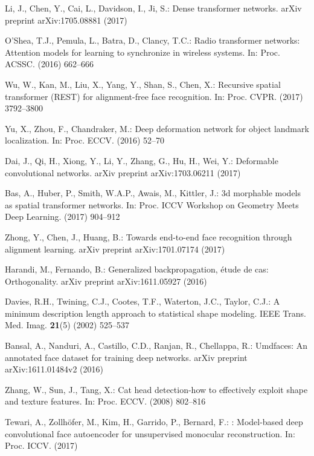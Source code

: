 \documentclass[runningheads]{llncs}
\begin{document}
\begin{thebibliography}{10}
Li, J., Chen, Y., Cai, L., Davidson, I., Ji, S.:
\newblock Dense transformer networks.
\newblock arXiv preprint arXiv:1705.08881 (2017)

O'Shea, T.J., Pemula, L., Batra, D., Clancy, T.C.:
\newblock Radio transformer networks: Attention models for learning to
  synchronize in wireless systems.
\newblock In: Proc. ACSSC. (2016)  662--666

Wu, W., Kan, M., Liu, X., Yang, Y., Shan, S., Chen, X.:
\newblock Recursive spatial transformer ({REST}) for alignment-free face
  recognition.
\newblock In: Proc. CVPR. (2017)  3792--3800

Yu, X., Zhou, F., Chandraker, M.:
\newblock Deep deformation network for object landmark localization.
\newblock In: Proc. ECCV. (2016)  52--70

Dai, J., Qi, H., Xiong, Y., Li, Y., Zhang, G., Hu, H., Wei, Y.:
\newblock Deformable convolutional networks.
\newblock arXiv preprint arXiv:1703.06211 (2017)

Bas, A., Huber, P., Smith, W.A.P., Awais, M., Kittler, J.:
\newblock 3d morphable models as spatial transformer networks.
\newblock In: Proc. ICCV Workshop on Geometry Meets Deep Learning. (2017)
  904--912

Zhong, Y., Chen, J., Huang, B.:
\newblock Towards end-to-end face recognition through alignment learning.
\newblock arXiv preprint arXiv:1701.07174 (2017)

Harandi, M., Fernando, B.:
\newblock Generalized backpropagation, {\'e}tude de cas: Orthogonality.
\newblock arXiv preprint arXiv:1611.05927 (2016)

Davies, R.H., Twining, C.J., Cootes, T.F., Waterton, J.C., Taylor, C.J.:
\newblock A minimum description length approach to statistical shape modeling.
\newblock IEEE Trans. Med. Imag. \textbf{21}(5) (2002)  525--537

Bansal, A., Nanduri, A., Castillo, C.D., Ranjan, R., Chellappa, R.:
\newblock Umdfaces: An annotated face dataset for training deep networks.
\newblock arXiv preprint arXiv:1611.01484v2 (2016)

Zhang, W., Sun, J., Tang, X.:
\newblock Cat head detection-how to effectively exploit shape and texture
  features.
\newblock In: Proc. ECCV. (2008)  802--816

Tewari, A., Zollh{\"o}fer, M., Kim, H., Garrido, P., Bernard, F.:
: Model-based deep convolutional face autoencoder for
  unsupervised monocular reconstruction.
\newblock In: Proc. ICCV. (2017)

\end{thebibliography}
\end{document}
